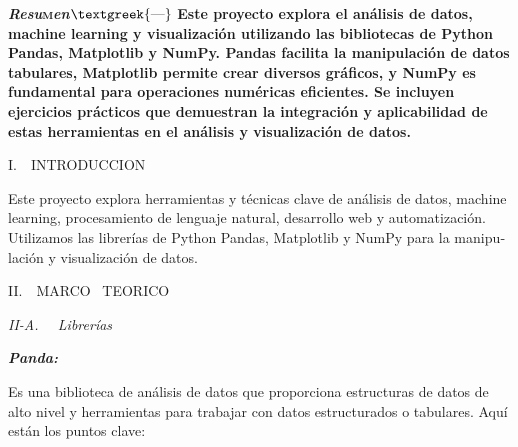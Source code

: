 \documentclass[letterpaper]{article}
\begin{document}
\begin{multicols}{2}

\bigskip


\bigskip

{
\textbf{\textit{Resu}}\textbf{\textsc{m}}\textbf{\textit{en}}\textbf{$\text{\textgreek{—}}$} \textbf{Este proyecto
explora el análisis de datos, machine learning y visualización utilizando las bibliotecas de Python Pandas, Matplotlib
y NumPy. Pandas facilita la manipulación de datos tabulares, Matplotlib permite crear diversos gráficos, y NumPy es
fundamental para operaciones numéricas eficientes. Se incluyen ejercicios prácticos que demuestran la integración y
aplicabilidad de estas herramientas en el análisis y visualización de datos.}}


\bigskip


\bigskip

{
I.\ \ INTRODUCCION}

{
\foreignlanguage{spanish}{Este proyecto explora herramientas y técnicas clave de análisis de datos, machine learning,
procesamiento de lenguaje natural, desarrollo web y automatización. Utilizamos las librerías de Python Pandas,
Matplotlib y NumPy para la manipulación y visualización de datos.}}


\bigskip


\bigskip


\bigskip


\bigskip


\bigskip


\bigskip


\bigskip


\bigskip


\bigskip


\bigskip


\bigskip


\bigskip


\bigskip


\bigskip


\bigskip


\bigskip

{
II.\ \ MARCO \ TEORICO}

{
\textit{II-A. \ \ Librerías}}

{
\foreignlanguage{spanish}{\textbf{\textit{{Panda}}}}\foreignlanguage{spanish}{\textbf{\textit{:}}}}

{
\foreignlanguage{spanish}{Es una biblioteca de análisis de datos que proporciona estructuras de datos de alto nivel y
herramientas para trabajar con datos estructurados o tabulares. Aquí están los puntos clave:}}



\end{multicols}
\end{document}
